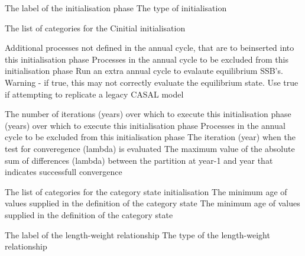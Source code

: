  {The label of the initialisation phase}
 {The type of initialisation}
\par\textbf{}\par
{} {The list of categories for the Cinitial initialisation}
\par\textbf{}\par
{} {Additional processes not defined in the annual cycle, that are to beinserted into this initialisation phase}
 {Processes in the annual cycle to be excluded from this initialisation phase}
 {Run an extra annual cycle to evalaute equilibrium SSB's. Warning - if true, this may not correctly evaluate the equilibrium state. Use true if attempting to replicate a legacy CASAL model}
\par\textbf{}\par
{} {The number of iterations (years) over which to execute this initialisation phase}
 {(years) over which to execute this initialisation phase}
 {Processes in the annual cycle to be excluded from this initialisation phase}
 {The iteration (year) when the test for converegence (lambda) is evaluated}
 {The maximum value of the absolute sum of differences (lambda) between the partition at year-1 and year that indicates successfull convergence}
\par\textbf{}\par
{} {The list of categories for the category state initialisation}
 {The minimum age of values supplied in the definition of the category state}
 {The minimum age of values supplied in the definition of the category state}
\par\par
{} {The label of the length-weight relationship}
 {The type of the length-weight relationship}
\par\par
{}\par\par
